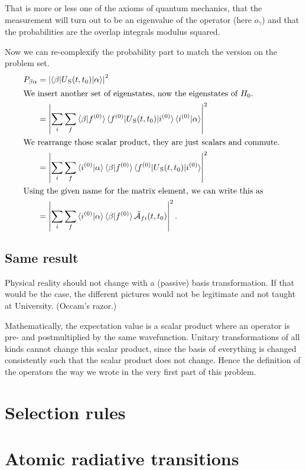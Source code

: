 \documentclass[11pt, english, fleqn, DIV=15, headinclude, BCOR=1.5cm]{scrartcl}
\begin{document}
That is more or less one of the axioms of quantum mechanics, that the
measurement will turn out to be an eigenvalue of the operator (here $o_\gamma$)
and that the probabilities are the overlap integrals modulus squared.

Now we can re-complexify the probability part to match the version on
the problem set.
\begin{align*}
    P_{\beta\alpha}
    &= \abs{\braket{\beta | U\SP(t, t_0)| \alpha}}^2 \\
    \intertext{%
        We insert another set of eigenstates, now the eigenstates of $H_0$.
    }
    &= \abs{\sum_i \sum_f \braket{\beta | f\0} \braket{f\0 | U\SP(t, t_0)| i\0}
    \braket{i\0 | \alpha}}^2 \\
    \intertext{%
        We rearrange those scalar product, they are just scalars and commute.
    }
    &= \abs{\sum_i \sum_f \braket{i\0 | \alpha} \braket{\beta | f\0}
    \braket{f\0 | U\SP(t, t_0)| i\0} }^2 \\
    \intertext{%
        Using the given name for the matrix element, we can write this as
    }
    &= \abs{\sum_i \sum_f \braket{i\0 | \alpha} \braket{\beta | f\0}
    \tilde{\mathcal A}_{fi}(t, t_0) }^2.
\end{align*}

\subsection{Same result}

Physical reality should not change with a (passive) basis transformation. If
that would be the case, the different pictures would not be legitimate and not
taught at University. (Occam's razor.)

Mathematically, the expectation value is a scalar product where an operator is
pre- and postmultiplied by the same wavefunction. Unitary transformations of
all kinds cannot change this scalar product, since the basis of everything is
changed consistently such that the scalar product does not change. Hence the
definition of the operators the way we wrote in the very first part of this
problem.

\section{Selection rules}

\section{Atomic radiative transitions}
\end{document}
